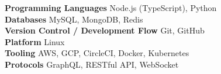 

\begin{cvparagraph}

\textbf{Programming Languages}
  \hfill{Node.js (TypeScript), Python} \\
\textbf{Databases}
  \hfill{MySQL, MongoDB, Redis} \\
\textbf{Version Control / Development Flow}
  \hfill{Git, GitHub} \\
\textbf{Platform}
  \hfill{Linux} \\
\textbf{Tooling}
  \hfill{AWS, GCP, CircleCI, Docker, Kubernetes} \\
\textbf{Protocols}
  \hfill{GraphQL, RESTful API, WebSocket} \\
\end{cvparagraph}
